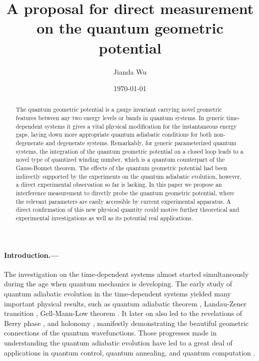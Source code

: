 \documentclass[aps,pra,twocolumn,
groupedaddress,10pt]{revtex4}
\begin{document}
\title{A proposal for direct measurement on the quantum geometric potential}
\author{Jianda Wu}



\begin{abstract}
The quantum geometric potential is a gauge invariant carrying
novel geometric features between any two energy levels or bands in quantum systems.
In generic time-dependent systems it gives a vital physical modification for
the instantaneous energy gaps, laying down more appropriate quantum adiabatic
conditions for both non-degenerate and degenerate systems.
Remarkably, for generic parameterized quantum systems,
the integration of the quantum geometric potential on a closed loop leads to a
novel type of quantized winding number, which is a quantum counterpart of the
Gauss-Bonnet theorem. The effects of the quantum geometric potential
had been indirectly supported by the experiments on the quantum adiabatic evolution,
however, a direct experimental observation
so far is lacking. In this paper we propose an interference measurement to
directly probe the quantum geometric potential, where the relevant parameters are
easily accessible by current
experimental apparatus. A direct confirmation of this new physical quantity could
motive further theoretical and experimental investigations as well as its potential
 real applications.
\end{abstract}

\date{\today}

\maketitle
\paragraph*{Introduction.---}
The investigation on the time-dependent systems almost started
simultaneously during the age when quantum mechanics is developing. The early study
of quantum adiabatic evolution in the time-dependent systems
yielded many important physical results, such as quantum adiabatic theorem
\cite{Born1928,Schwinger1937,Kato1950},
Landau-Zener transition \cite{Landau1932,Zener1932},
Gell-Mann-Low theorem \cite{Gellmann1951}. It later on
also led to the revelations of Berry phase \cite{berry1984proc},
and holonomy \cite{simon1983holonomy}, manifestly demonstrating the
beautiful geometric connections of the quantum wavefunctions.
Those progresses made in understanding the quantum adiabatic evolution
have led to a great deal of applications in quantum control,
quantum annealing, and quantum computation \cite{Oreg1984,Schiemann1993,Pillet1993,Jones2000,
farhi2001quantum,Childs2001,Zheng2005,ashhab2006decoherence,
das2008colloquium,Lidar2009,bason2012high,georgescu2014quantum,Lidar2016,Santos2017}.
\end{document}
